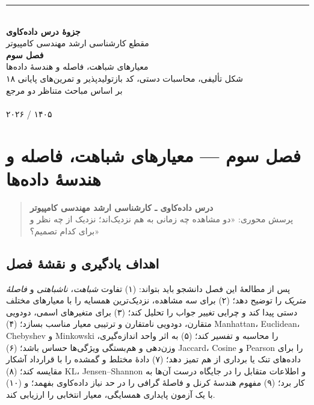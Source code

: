 \documentclass[12pt,a4paper,oneside]{book}
\begin{document}
\begin{titlepage}
\centering
\vspace*{1.9cm}
{\color{AcademicTeal}\rule{0.8\textwidth}{2.5pt}}\\[1.3cm]
{\Huge\bfseries جزوهٔ درس داده‌کاوی}\\[0.6cm]
{\Large مقطع کارشناسی ارشد مهندسی کامپیوتر}\\[2cm]
{\Huge\bfseries فصل سوم}\\[0.6cm]
{\LARGE معیارهای شباهت، فاصله و هندسهٔ داده‌ها}\\[1.5cm]
{\large ۱۸ شکل تألیفی، محاسبات دستی، کد بازتولیدپذیر و تمرین‌های پایانی}\\[2cm]
{\large بر اساس مباحث متناظر دو مرجع}\\[0.3cm]
{\small{}}\\[0.15cm]
{\small{}}
\vfill
{\large ۲۰۲۶ / ۱۴۰۵}
\end{titlepage}
\tableofcontents\clearpage
\chapter{فصل سوم --- معیارهای شباهت، فاصله و هندسهٔ داده‌ها}\label{ux641ux635ux644-ux633ux648ux645-ux645ux639ux6ccux627ux631ux647ux627ux6cc-ux634ux628ux627ux647ux62a-ux641ux627ux635ux644ux647-ux648-ux647ux646ux62fux633ux647-ux62fux627ux62fux647ux647ux627}

\begin{quote}
\textbf{درس داده‌کاوی ـ کارشناسی ارشد مهندسی کامپیوتر}\\
پرسش محوری: «دو مشاهده چه زمانی به هم نزدیک‌اند؛ نزدیک از چه نظر و برای کدام تصمیم؟»
\end{quote}

\section{اهداف یادگیری و نقشهٔ فصل}\label{ux627ux647ux62fux627ux641-ux6ccux627ux62fux6afux6ccux631ux6cc-ux648-ux646ux642ux634ux647-ux641ux635ux644}

پس از مطالعهٔ این فصل دانشجو باید بتواند: (۱) تفاوت \emph{شباهت}، \emph{ناشباهتی} و \emph{فاصلهٔ متریک} را توضیح دهد؛ (۲) برای سه مشاهده، نزدیک‌ترین همسایه را با معیارهای مختلف دستی پیدا کند و چرایی تغییر جواب را تحلیل کند؛ (۳) برای متغیرهای اسمی، دودویی متقارن، دودویی نامتقارن و ترتیبی معیار مناسب بسازد؛ (۴) Manhattan، Euclidean، Chebyshev و Minkowski را محاسبه و تفسیر کند؛ (۵) به اثر واحد اندازه‌گیری، وزن‌دهی و هم‌بستگی ویژگی‌ها حساس باشد؛ (۶) Jaccard، Cosine و Pearson را برای داده‌های تنک یا برداری از هم تمیز دهد؛ (۷) دادهٔ مختلط و گمشده را با قرارداد آشکار مقایسه کند؛ (۸) KL، Jensen--Shannon و اطلاعات متقابل را در جایگاه درست آن‌ها به کار برد؛ (۹) مفهوم هندسهٔ کرنل و فاصلهٔ گرافی را در حد نیاز داده‌کاوی بفهمد؛ و (۱۰) با یک آزمون پایداری همسایگی، معیار انتخابی را ارزیابی کند.
\end{document}
